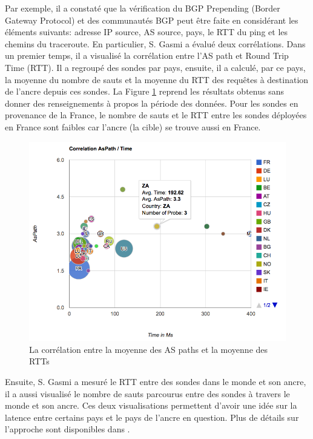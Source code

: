 Par exemple, il a constaté que la vérification du BGP Prepending (Border Gateway Protocol) et des communautés BGP  peut être faite en  considérant les éléments suivants: adresse IP source, AS source, pays, le RTT du ping et les chemins du traceroute. En particulier, S. Gasmi a évalué deux corrélations. Dans un premier temps, il a visualisé la corrélation entre l'AS path et Round Trip Time (RTT). Il a regroupé des sondes par pays, ensuite, il a calculé, par ce pays, la moyenne du nombre de sauts et la moyenne du RTT des requêtes à destination de l'ancre depuis ces sondes.
La Figure \ref{fig:1-AS-Path-Time-correlationv} reprend les résultats obtenus sans donner des renseignements à propos la période des données. Pour les sondes en provenance de la France,  le nombre de sauts et le RTT entre les sondes déployées en France sont faibles car l'ancre (la cible) se trouve aussi en France.
\begin{figure}[h]
	\centering
	\captionsetup{justification=centering}
	\includegraphics[width=1\linewidth]{illustrations/1-AS-Path-Time-correlation}
	\caption{La corrélation entre la moyenne des AS paths et la moyenne des RTTs \cite{Salim-Gasmi}}
	\label{fig:1-AS-Path-Time-correlationv}
\end{figure}
Ensuite, S. Gasmi a mesuré le RTT entre des sondes dans le monde et son ancre, il a aussi visualisé le nombre de sauts parcourus entre des sondes à travers le monde et son ancre. Ces deux visualisations permettent d'avoir une idée sur la latence entre certains pays et le pays de l'ancre en question. Plus de détails sur l'approche sont disponibles dans \cite{Salim-Gasmi}.

